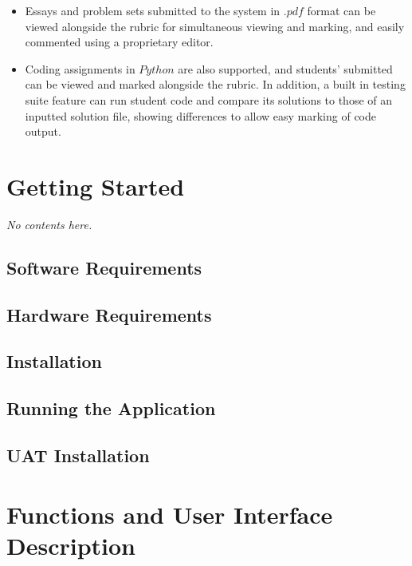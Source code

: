 \documentclass{article}
\begin{document}
\begin{itemize}
    \begin{itemize}
      \item Essays and problem sets submitted to the system in $.pdf$ format can be 
	viewed alongside the rubric for simultaneous viewing and marking, and easily 
	commented using a proprietary editor. 
      \item Coding assignments in $Python$ are also supported, and students' submitted
	can be viewed and marked alongside the rubric. In addition, a built in testing
	suite feature can run student code and compare its solutions to those of an
	inputted solution file, showing differences to allow easy marking of code
	output.
    \end{itemize}
\end{itemize}

\section{Getting Started}
\emph{No contents here.}

\subsection{Software Requirements}

\subsection{Hardware Requirements}

\subsection{Installation}

\subsection{Running the Application}

\subsection{UAT Installation}

\section{Functions and User Interface Description}  %
\end{document}
